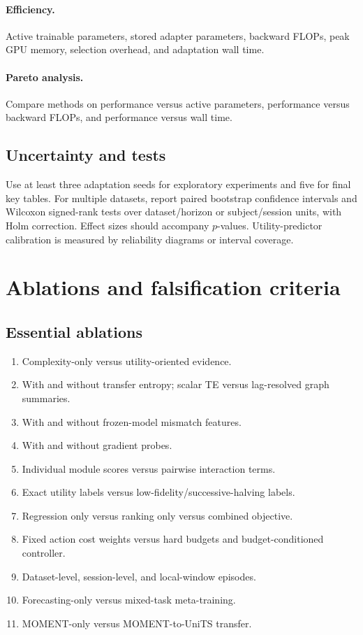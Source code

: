 \documentclass[10pt]{article}
\begin{document}
\paragraph{Efficiency.} Active trainable parameters, stored adapter parameters, backward FLOPs, peak GPU memory, selection overhead, and adaptation wall time.

\paragraph{Pareto analysis.} Compare methods on performance versus active parameters, performance versus backward FLOPs, and performance versus wall time.

\subsection{Uncertainty and tests}

Use at least three adaptation seeds for exploratory experiments and five for final key tables. For multiple datasets, report paired bootstrap confidence intervals and Wilcoxon signed-rank tests over dataset/horizon or subject/session units, with Holm correction. Effect sizes should accompany $p$-values. Utility-predictor calibration is measured by reliability diagrams or interval coverage.

\section{Ablations and falsification criteria}

\subsection{Essential ablations}

\begin{enumerate}[leftmargin=*, itemsep=2pt]
    \item Complexity-only versus utility-oriented evidence.
    \item With and without transfer entropy; scalar TE versus lag-resolved graph summaries.
    \item With and without frozen-model mismatch features.
    \item With and without gradient probes.
    \item Individual module scores versus pairwise interaction terms.
    \item Exact utility labels versus low-fidelity/successive-halving labels.
    \item Regression only versus ranking only versus combined objective.
    \item Fixed action cost weights versus hard budgets and budget-conditioned controller.
    \item Dataset-level, session-level, and local-window episodes.
    \item Forecasting-only versus mixed-task meta-training.
    \item MOMENT-only versus MOMENT-to-UniTS transfer.
\end{enumerate}
\end{document}

